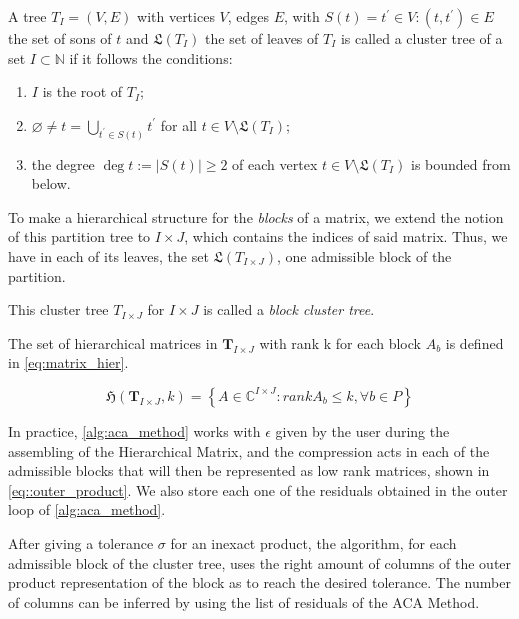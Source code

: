 A tree $T_{I} = (V,E)$ with vertices $V$, edges $E$, with $S(t)={t^{'} \in V : (t,t^{'})\in E}$ the set of sons of $t$ and $\mathfrak{L}(T_{I})$ the set of leaves of $T_{I}$ is called a cluster tree of a set $I\subset \mathbb{N}$ if it follows the conditions:

\begin{enumerate}
    \item $I$ is the root of $T_{I}$;
    \item $\varnothing \neq t = \bigcup_{t^{'} \in S(t)} t^{'} $ for all $t \in V \setminus   \mathfrak{L}(T_{I}) $;
    \item the degree $\deg t := |S(t)| \geq 2$ of each vertex $t \in V \setminus \mathfrak{L}(T_{I})$ is bounded from below.
\end{enumerate}



To make a hierarchical structure for the \textit{blocks} of a matrix, we extend the notion of this partition tree to $I \times J$, which contains the indices of said matrix. Thus, we have in each of its leaves, the set $\mathfrak{L}(T_{I \times J})$, one admissible block of the partition. 

This cluster tree $T_{I \times J}$ for $I \times J$ is called a \textit{block cluster tree}. 


The set of hierarchical matrices in $\mathbf{T}_{I \times J}$ with rank k for each block $A_{b}$ is defined in \ref{eq:matrix_hier}.

\begin{equation}\label{eq:matrix_hier}
    \mathfrak{H}(\mathbf{T}_{I \times J},k) = \left\{  A\in \mathbb{C}^{I\times J} : rankA_{b} \leq k, \forall b \in P \right\}
\end{equation}



In practice, \ref{alg:aca_method} works with $\epsilon$ given by the user during the assembling of the Hierarchical Matrix, and the compression acts in each of the admissible blocks that will then be represented as low rank matrices, shown in \ref{eq::outer_product}. We also store each one of the residuals obtained in the outer loop of \ref{alg:aca_method}.

After giving a tolerance $\sigma$ for an inexact product, the algorithm, for each admissible block of the cluster tree, uses the right amount of columns of the outer product representation of the block as to reach the desired tolerance. The number of columns can be inferred by using the list of residuals of the ACA Method.

